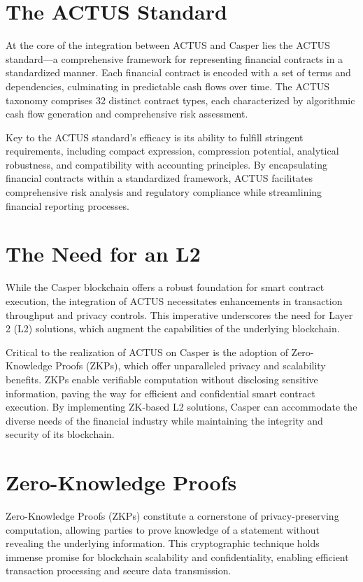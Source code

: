 \documentclass[12pt]{article}
\begin{document}
\section{The ACTUS Standard}

At the core of the integration between ACTUS and Casper lies the ACTUS
standard—a comprehensive framework for representing financial contracts in a
standardized manner. Each financial contract is encoded with a set of terms and
dependencies, culminating in predictable cash flows over time. The ACTUS
taxonomy comprises 32 distinct contract types, each characterized by algorithmic
cash flow generation and comprehensive risk assessment.

Key to the ACTUS standard's efficacy is its ability to fulfill stringent
requirements, including compact expression, compression potential, analytical
robustness, and compatibility with accounting principles. By encapsulating
financial contracts within a standardized framework, ACTUS facilitates
comprehensive risk analysis and regulatory compliance while streamlining
financial reporting processes.

\section{The Need for an L2}

While the Casper blockchain offers a robust foundation for smart contract
execution, the integration of ACTUS necessitates enhancements in transaction
throughput and privacy controls. This imperative underscores the need for Layer
2 (L2) solutions, which augment the capabilities of the underlying blockchain.

Critical to the realization of ACTUS on Casper is the adoption of Zero-Knowledge
Proofs (ZKPs), which offer unparalleled privacy and scalability benefits. ZKPs
enable verifiable computation without disclosing sensitive information, paving
the way for efficient and confidential smart contract execution. By implementing
ZK-based L2 solutions, Casper can accommodate the diverse needs of the financial
industry while maintaining the integrity and security of its blockchain.

\section{Zero-Knowledge Proofs}

Zero-Knowledge Proofs (ZKPs) constitute a cornerstone of privacy-preserving
computation, allowing parties to prove knowledge of a statement without
revealing the underlying information. This cryptographic technique holds immense
promise for blockchain scalability and confidentiality, enabling efficient
transaction processing and secure data transmission.
\end{document}
